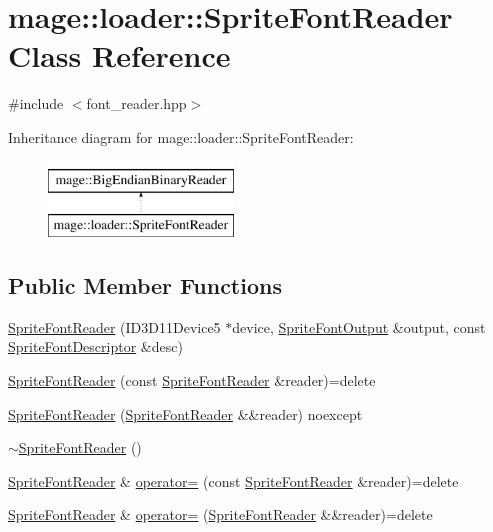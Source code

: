 \hypertarget{classmage_1_1loader_1_1_sprite_font_reader}{}\section{mage\+:\+:loader\+:\+:Sprite\+Font\+Reader Class Reference}
\label{classmage_1_1loader_1_1_sprite_font_reader}


{\ttfamily \#include $<$font\+\_\+reader.\+hpp$>$}

Inheritance diagram for mage\+:\+:loader\+:\+:Sprite\+Font\+Reader\+:\begin{figure}[H]
\begin{center}
\leavevmode
\includegraphics[height=2.000000cm]{classmage_1_1loader_1_1_sprite_font_reader}
\end{center}
\end{figure}
\subsection*{Public Member Functions}
\begin{DoxyCompactItemize}
\item 
\hyperlink{classmage_1_1loader_1_1_sprite_font_reader_aeb66e93ba6fea6590dcb4ddb290d279d}{Sprite\+Font\+Reader} (I\+D3\+D11\+Device5 $\ast$device, \hyperlink{structmage_1_1_sprite_font_output}{Sprite\+Font\+Output} \&output, const \hyperlink{classmage_1_1_sprite_font_descriptor}{Sprite\+Font\+Descriptor} \&desc)
\item 
\hyperlink{classmage_1_1loader_1_1_sprite_font_reader_aedfd065cd87ae46855b98efe9a73752b}{Sprite\+Font\+Reader} (const \hyperlink{classmage_1_1loader_1_1_sprite_font_reader}{Sprite\+Font\+Reader} \&reader)=delete
\item 
\hyperlink{classmage_1_1loader_1_1_sprite_font_reader_aaeca152199f1772be8c046ade184c6e8}{Sprite\+Font\+Reader} (\hyperlink{classmage_1_1loader_1_1_sprite_font_reader}{Sprite\+Font\+Reader} \&\&reader) noexcept
\item 
\hyperlink{classmage_1_1loader_1_1_sprite_font_reader_a6734ae8c3bfe35d7199815c3383647f3}{$\sim$\+Sprite\+Font\+Reader} ()
\item 
\hyperlink{classmage_1_1loader_1_1_sprite_font_reader}{Sprite\+Font\+Reader} \& \hyperlink{classmage_1_1loader_1_1_sprite_font_reader_a65ddea9d2f842f2e6d81c3f4dccb62a6}{operator=} (const \hyperlink{classmage_1_1loader_1_1_sprite_font_reader}{Sprite\+Font\+Reader} \&reader)=delete
\item 
\hyperlink{classmage_1_1loader_1_1_sprite_font_reader}{Sprite\+Font\+Reader} \& \hyperlink{classmage_1_1loader_1_1_sprite_font_reader_a99c1034c7dbe89b5e2dc2f2106c09360}{operator=} (\hyperlink{classmage_1_1loader_1_1_sprite_font_reader}{Sprite\+Font\+Reader} \&\&reader)=delete
\end{DoxyCompactItemize}
